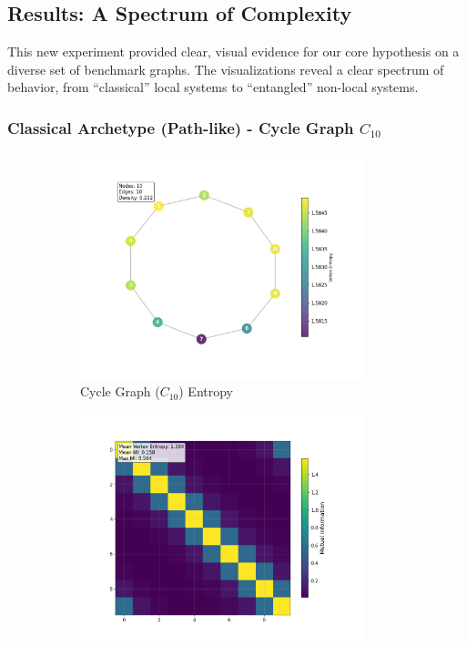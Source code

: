\documentclass[12pt, letterpaper]{article}
\begin{document}
\subsection{Results: A Spectrum of Complexity}
This new experiment provided clear, visual evidence for our core hypothesis on a diverse set of benchmark graphs. The visualizations reveal a clear spectrum of behavior, from ``classical'' local systems to ``entangled'' non-local systems.

\subsubsection{Classical Archetype (Path-like) - Cycle Graph \texorpdfstring{$C_{10}$}{C10}}

\begin{figure}[H]
    \centering
    \begin{subfigure}[b]{0.48\textwidth}
        \includegraphics[width=0.9\textwidth]{images/Graph Visualizations/Classical/Cycle_Vertex_Entropy.png}
        \caption{Cycle Graph ($C_{10}$) Entropy}
        \label{fig:cycle_entropy}
    \end{subfigure}
    \hfill
    \begin{subfigure}[b]{0.48\textwidth}
        \includegraphics[width=0.9\textwidth]{images/Graph Visualizations/Classical/Cycle_Vertex_MI_Matrix.png}

\end{subfigure}
\end{figure}
\end{document}
